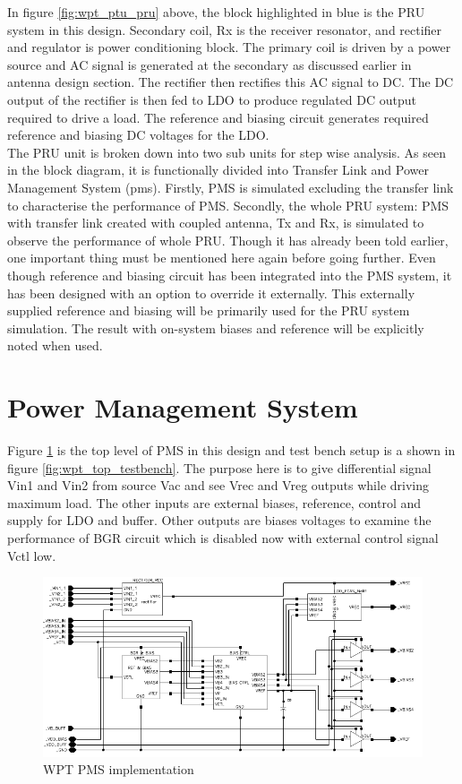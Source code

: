 \documentclass[UKenglish]{ifimaster}  %
\begin{document}
In figure \ref{fig:wpt_ptu_pru} above, the block highlighted in blue is the PRU system in this design. Secondary coil, Rx is the receiver resonator, and  
rectifier and regulator is power conditioning block. The primary coil is driven by a power source and AC signal is generated at the secondary as discussed 
earlier in antenna design section. The rectifier then rectifies this AC signal to DC. The DC output of the rectifier is then fed to LDO 
to produce regulated DC output required to drive a load. The reference and biasing circuit generates required reference and biasing DC voltages for the LDO. \\

The PRU unit is broken down into two sub units for step wise analysis. As seen in the block diagram, it is functionally divided into Transfer Link and 
Power Management System (\acrshort{pms}). Firstly, PMS is simulated excluding the transfer link to characterise the performance of PMS. Secondly, the whole PRU system: PMS with transfer link created with coupled antenna, Tx and Rx, is simulated to observe the performance of whole PRU. Though it has already been told earlier, 
one important thing must be mentioned here again before going further. Even though reference and biasing circuit has 
been integrated into the PMS system, it has been designed with an option to override it externally. This externally 
supplied reference and biasing will be primarily used for the PRU system simulation. The result with on-system biases 
and reference will be explicitly noted when used. \\

\section{Power Management System}

Figure \ref{fig:wpt_top} is the top level of PMS in this design and test bench setup is a shown in figure \ref{fig:wpt_top_testbench}. The purpose here is to give differential signal Vin1 and Vin2 from source Vac and see Vrec and Vreg outputs while driving maximum load. The other inputs are external biases, reference, control and supply for LDO and buffer. Other outputs are biases voltages to examine the performance of BGR circuit which is disabled now with external control signal Vctl low.  \\

\begin{figure} [!htbp]
  \centering
  \includegraphics[width=\textwidth]{img/wpt_top.pdf} 
 \caption{WPT PMS implementation} 
\label{fig:wpt_top} 
\end{figure}
\end{document}
